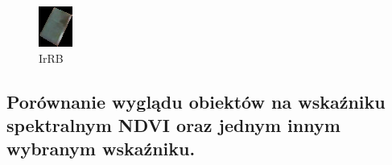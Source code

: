\documentclass[a4paper,12pt]{article}  %
\begin{document}
\begin{figure}[H]
\begin{minipage}{0.24\textwidth}
        \includegraphics[width=\linewidth]{spektralne/irrb_budynek3_maska.png}
        \caption*{IrRB}
    \end{minipage}
\end{figure}

\newpage
\subsection{Porównanie wyglądu obiektów na wskaźniku spektralnym NDVI oraz jednym innym wybranym wskaźniku.}
\end{document}
